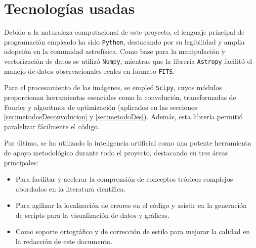 

\section{Tecnologías usadas}
\label{sec:tecnologias_usadas}
Debido a la naturaleza computacional de este proyecto, el lenguaje principal de programación empleado ha sido \texttt{Python}, destacando por su legibilidad y amplia adopción en la comunidad astrofísica. Como base para la manipulación y vectorización de datos se utilizó \texttt{Numpy}, mientras que la librería \texttt{Astropy} facilitó el manejo de datos observacionales reales en formato \texttt{FITS}. 

Para el procesamiento de las imágenes, se empleó \texttt{Scipy}, cuyos módulos proporcionan herramientas esenciales como la convolución, transformadas de Fourier y algoritmos de optimización (aplicados en las secciones \ref{sec:metodosDeconvolucion} y \ref{sec:metodoDes}). Además, esta librería permitió paralelizar fácilmente el código.

Por último, se ha utilizado la inteligencia artificial como una potente herramienta de apoyo metodológico durante todo el proyecto, destacando en tres áreas principales:

\begin{itemize}
    \item Para facilitar y acelerar la comprensión de conceptos teóricos complejos abordados en la literatura científica.
    \item Para agilizar la localización de errores en el código y asistir en la generación de scripts para la visualización de datos y gráficas.
    \item Como soporte ortográfico y de corrección de estilo para mejorar la calidad en la redacción de este documento.
\end{itemize}